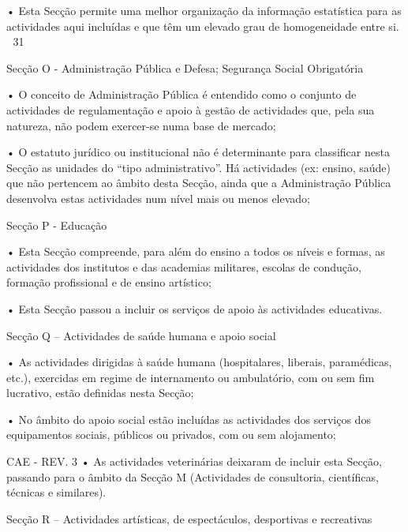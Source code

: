              • Esta Secção permite uma melhor organização da informação estatística para as actividades aqui
               incluídas e que têm um elevado grau de homogeneidade entre si.
                                                                                                              31



Secção O - Administração Pública e Defesa; Segurança Social Obrigatória

        • O conceito de Administração Pública é entendido como o conjunto de actividades de
          regulamentação e apoio à gestão de actividades que, pela sua natureza, não podem exercer-se
          numa base de mercado;

        • O estatuto jurídico ou institucional não é determinante para classificar nesta Secção as unidades
          do “tipo administrativo”. Há actividades (ex: ensino, saúde) que não pertencem ao âmbito desta
          Secção, ainda que a Administração Pública desenvolva estas actividades num nível mais ou
          menos elevado;

Secção P - Educação

        • Esta Secção compreende, para além do ensino a todos os níveis e formas, as actividades dos
          institutos e das academias militares, escolas de condução, formação profissional e de ensino
          artístico;

        • Esta Secção passou a incluir os serviços de apoio às actividades educativas.

Secção Q – Actividades de saúde humana e apoio social

        • As actividades dirigidas à saúde humana (hospitalares, liberais, paramédicas, etc.), exercidas em
          regime de internamento ou ambulatório, com ou sem fim lucrativo, estão definidas nesta Secção;

        • No âmbito do apoio social estão incluídas as actividades dos serviços dos equipamentos sociais,
          públicos ou privados, com ou sem alojamento;




                                                                                                              CAE - REV. 3
        • As actividades veterinárias deixaram de incluir esta Secção, passando para o âmbito da Secção M
          (Actividades de consultoria, científicas, técnicas e similares).

Secção R – Actividades artísticas, de espectáculos, desportivas e recreativas

